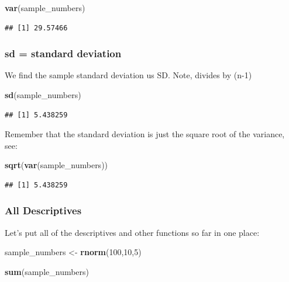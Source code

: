 \documentclass[]{book}
\newenvironment{Shaded}{\begin{snugshade}}{\end{snugshade}}
\newcommand{\KeywordTok}[1]{\textcolor[rgb]{0.13,0.29,0.53}{\textbf{#1}}}
\newcommand{\DecValTok}[1]{\textcolor[rgb]{0.00,0.00,0.81}{#1}}
\newcommand{\StringTok}[1]{\textcolor[rgb]{0.31,0.60,0.02}{#1}}
\newcommand{\NormalTok}[1]{#1}
\begin{document}
\begin{Shaded}
\begin{Highlighting}[]
\KeywordTok{var}\NormalTok{(sample_numbers)}
\end{Highlighting}
\end{Shaded}

\begin{verbatim}
## [1] 29.57466
\end{verbatim}

\subsubsection{sd = standard deviation}\label{sd-standard-deviation}

We find the sample standard deviation us SD. Note, divides by (n-1)

\begin{Shaded}
\begin{Highlighting}[]
\KeywordTok{sd}\NormalTok{(sample_numbers)}
\end{Highlighting}
\end{Shaded}

\begin{verbatim}
## [1] 5.438259
\end{verbatim}

Remember that the standard deviation is just the square root of the
variance, see:

\begin{Shaded}
\begin{Highlighting}[]
\KeywordTok{sqrt}\NormalTok{(}\KeywordTok{var}\NormalTok{(sample_numbers))}
\end{Highlighting}
\end{Shaded}

\begin{verbatim}
## [1] 5.438259
\end{verbatim}

\subsubsection{All Descriptives}\label{all-descriptives}

Let's put all of the descriptives and other functions so far in one
place:

\begin{Shaded}
\begin{Highlighting}[]
\NormalTok{sample_numbers <-}\StringTok{ }\KeywordTok{rnorm}\NormalTok{(}\DecValTok{100}\NormalTok{,}\DecValTok{10}\NormalTok{,}\DecValTok{5}\NormalTok{)}

\KeywordTok{sum}\NormalTok{(sample_numbers)}
\end{Highlighting}
\end{Shaded}
\end{document}
